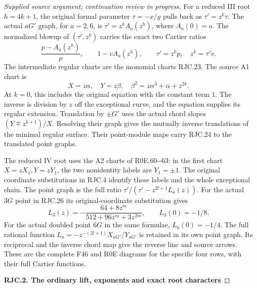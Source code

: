 \begin{proof}[Supplied source argument; continuation review in progress]
For a reduced III root \(h=4k+1\), the original formal parameter
\(\tau=-x/y\) pulls back as \(\tau'=z^k\tau\). The actual
\(aG'\) graph, for \(a=2,6\), is
\(\tau'=z^k A_a(z^h)\), where \(A_a(0)=a\).
The normalized blowup of \((\tau',z^k)\) carries the exact two
Cartier ratios
\[
 \frac{p-A_a(z^h)}p,\qquad 1-vA_a(z^h),\qquad
 \tau'=z^kp,\quad z^k=\tau'v.
 \tag{RJC.24}
\]
The intermediate regular charts are the monomial charts RJC.23.
The source A1 chart is
\[
 X=z\alpha,\quad Y=z\beta,\quad
 \beta^2=z\alpha^3+\alpha+z^{2k}.
 \tag{RJC.25}
\]
At \(k=0\), this includes the original equation with the constant
term \(1\). The inverse is division by \(z\) off the exceptional
curve, and the equation supplies its regular extension. Translation
by \(\pm G'\) uses the actual chord slopes
\((Y\mp z^{k+1})/X\). Resolving their graph gives the mutually
inverse translations of the minimal regular surface. Their
point-module maps carry RJC.24 to the translated point graphs.

The reduced IV root uses the A2 charts of R0E.60-\/-63: in the first
chart \(X=zX_1,Y=zY_1\), the two nonidentity labels are \(Y_1=\pm1\).
The original coordinate substitutions in RJC.4 identify these
labels and the whole exceptional chain. The point graph is the
full ratio \(\tau'/(\tau'-z^{2l+1}L_a(z))\). For the actual
\(3G\) point in RJC.26 its original-coordinate substitution gives
\[
 L_3(z)=-\frac{64+8z^m}{512+96z^m+3z^{2m}},
 \qquad L_3(0)=-1/8.
\]
For the actual doubled point \(6G\) in the same formulae,
\(L_6(0)=-1/4\). The full rational function
\(L_a=-z^{-(2l+1)}X_{aG'}/Y_{aG'}\)
is retained in its own point graph.
Its reciprocal and the inverse chord map give the reverse line
and source arrows. These are the complete F46 and R0E diagrams
for the specific four rows, with their full Cartier functions.

\par

\medskip\noindent\textbf{RJC.2. The ordinary lift, exponents and exact root characters}

\par\nobreak


\end{proof}
